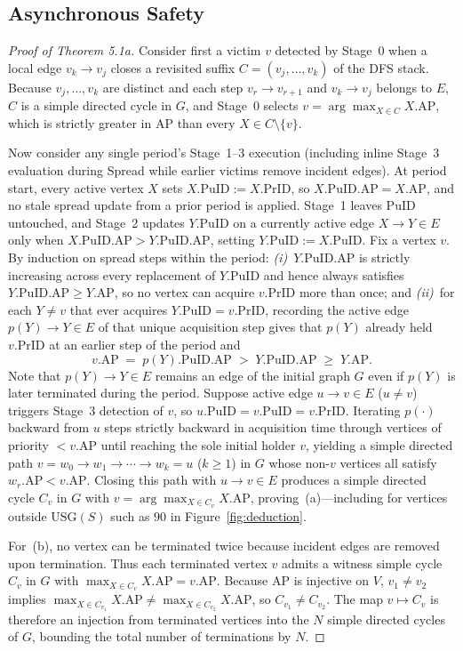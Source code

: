 \documentclass[sigconf,nonacm]{acmart}
\newcommand{\puid}{\mathrm{PuID}}
\newcommand{\prid}{\mathrm{PrID}}
\newcommand{\ap}{\mathrm{AP}}
\newcommand{\usg}{\mathrm{USG}}
\begin{document}
\subsection{Asynchronous Safety}
\label{sec:async-safety}
\begin{proof}[Proof of Theorem 5.1a]
Consider first a victim \(v\) detected by Stage~0 when a local edge
\(v_k\to v_j\) closes a revisited suffix \(C=(v_j,\dots,v_k)\) of the
DFS stack. Because \(v_j,\dots,v_k\) are distinct and each step
\(v_r\to v_{r+1}\) and \(v_k\to v_j\) belongs to \(E\), \(C\) is a
simple directed cycle in \(G\), and Stage~0 selects
\(v=\arg\max_{X\in C} X.\ap\), which is strictly greater in \(\ap\) than
every \(X\in C\setminus\{v\}\).

Now consider any single period's Stage~1--3 execution (including inline
Stage~3 evaluation during Spread while earlier victims remove incident
edges). At period start, every active vertex \(X\) sets
\(X.\puid:=X.\prid\), so \(X.\puid.\ap=X.\ap\), and no stale spread
update from a prior period is applied. Stage~1 leaves \(\puid\)
untouched, and Stage~2 updates \(Y.\puid\) on a currently active edge
\(X\to Y\in E\) only when \(X.\puid.\ap>Y.\puid.\ap\), setting
\(Y.\puid:=X.\puid\). Fix a vertex \(v\). By induction on spread steps
within the period: \emph{(i)}~\(Y.\puid.\ap\) is strictly increasing
across every replacement of \(Y.\puid\) and hence always satisfies
\(Y.\puid.\ap\ge Y.\ap\), so no vertex can acquire \(v.\prid\) more than
once; and \emph{(ii)}~for each \(Y\neq v\) that ever acquires
\(Y.\puid=v.\prid\), recording the active edge \(p(Y)\to Y\in E\) of
that unique acquisition step gives that \(p(Y)\) already held
\(v.\prid\) at an earlier step of the period and
\[
  v.\ap \;=\; p(Y).\puid.\ap \;>\; Y.\puid.\ap \;\ge\; Y.\ap.
\]
Note that \(p(Y)\to Y\in E\) remains an edge of the initial graph \(G\)
even if \(p(Y)\) is later terminated during the period. Suppose active
edge \(u\to v\in E\) (\(u\neq v\)) triggers Stage~3 detection of \(v\),
so \(u.\puid=v.\puid=v.\prid\). Iterating \(p(\cdot)\) backward from
\(u\) steps strictly backward in acquisition time through vertices of
priority \(<v.\ap\) until reaching the sole initial holder \(v\),
yielding a simple directed path \(v=w_0\to w_1\to\cdots\to w_k=u\)
(\(k\ge 1\)) in \(G\) whose non-\(v\) vertices all satisfy
\(w_r.\ap<v.\ap\). Closing this path with \(u\to v\in E\) produces a
simple directed cycle \(C_v\) in \(G\) with
\(v=\arg\max_{X\in C_v} X.\ap\), proving~(a)---including for vertices
outside \(\usg(S)\) such as \(90\) in Figure~\ref{fig:deduction}.

For~(b), no vertex can be terminated twice because incident edges are
removed upon termination. Thus each terminated vertex \(v\) admits a
witness simple cycle \(C_v\) in \(G\) with
\(\max_{X\in C_v} X.\ap = v.\ap\). Because \(\ap\) is injective on \(V\),
\(v_1\neq v_2\) implies \(\max_{X\in C_{v_1}} X.\ap \neq
\max_{X\in C_{v_2}} X.\ap\), so \(C_{v_1}\neq C_{v_2}\). The map
\(v\mapsto C_v\) is therefore an injection from terminated vertices into
the \(N\) simple directed cycles of \(G\), bounding the total number of
terminations by \(N\).
\end{proof}
\end{document}

